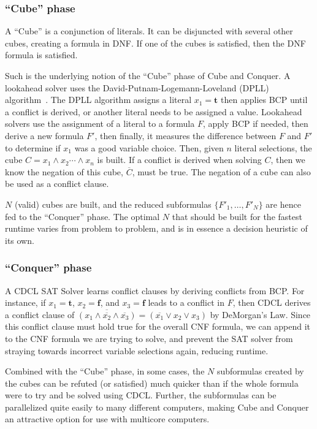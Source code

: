 \documentclass[12pt]{article}
\theoremstyle{definition}
\begin{document}
\subsubsection{``Cube'' phase} \label{subsubsec:cnccube}
A ``Cube'' is a conjunction of literals. It can be disjuncted with several other cubes, creating a formula in DNF. If one of the cubes is satisfied, then the DNF formula is satisfied. \par
Such is the underlying notion of the ``Cube'' phase of Cube and Conquer. A lookahead solver uses the David-Putnam-Logemann-Loveland (DPLL) algorithm~\cite{Davis:1962:MPT:368273.368557}. The DPLL algorithm assigns a literal $x_1 = \boldsymbol t$ then applies BCP until a conflict is derived, or another literal needs to be assigned a value. Lookahead solvers use the assignment of a literal to a formula $F$, apply BCP if needed, then derive a new formula $F'$, then finally, it measures the difference between $F$ and $F'$ to determine if $x_1$ was a good variable choice.  Then, given $n$ literal selections, the cube $C = x_1 \wedge x_2 \cdots \wedge x_n$ is built. If a conflict is derived when solving $C$, then we know the negation of this cube, $\overline{C}$, must be true. The negation of a cube can also be used as a conflict clause. \par
$N$ (valid) cubes are built, and the reduced subformulas $\{F'_1, \ldots, F'_N\}$ are hence fed to the ``Conquer'' phase. The optimal $N$ that should be built for the fastest runtime varies from problem to problem, and is in essence a decision heuristic of its own.

 \subsubsection{``Conquer'' phase} \label{subsubsec:cncconquer}
 A CDCL SAT Solver learns conflict clauses by deriving conflicts from BCP. For instance, if $x_1 = \boldsymbol t$, $x_2 = \boldsymbol f$, and $x_3 = \boldsymbol f$ leads to a conflict in $F$, then CDCL derives a conflict clause of $\overline{(x_1 \wedge \overline{x_2} \wedge \overline{x_3})} = (\overline{x_1} \vee x_2 \vee x_3)$ by DeMorgan's Law. Since this conflict clause must hold true for the overall CNF formula, we can append it to the CNF formula we are trying to solve, and prevent the SAT solver from straying towards incorrect variable selections again, reducing runtime. \par
 Combined with the ``Cube'' phase, in some cases, the $N$ subformulas created by the cubes can be refuted (or satisfied) much quicker than if the whole formula were to try and be solved using CDCL. Further, the subformulas can be parallelized quite easily to many different computers, making Cube and Conquer an attractive option for use with multicore computers.
 
\end{document}
